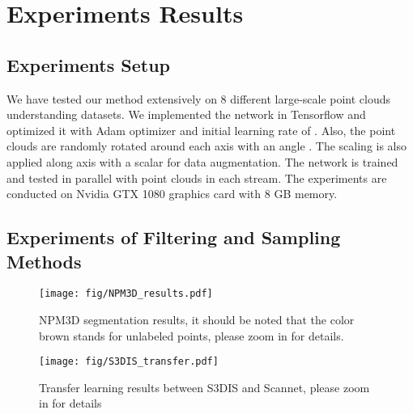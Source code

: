 \documentclass[journal]{IEEEtran}
\begin{document}
\vspace{-1.06mm}
\section{Experiments Results}
\subsection{Experiments Setup}
We have tested our method extensively on 8 different large-scale point clouds understanding datasets. We implemented the network in Tensorflow and optimized it with Adam optimizer and initial learning rate of .
Also, the point clouds are randomly rotated around each axis  with an angle . The scaling is also applied along  axis with a scalar  for data augmentation. The network is trained and tested in parallel with  point clouds in each stream. The experiments are conducted on Nvidia GTX 1080 graphics card with 8 GB memory. 
\subsection{Experiments of Filtering and Sampling Methods}



\begin{figure}[htbp!]
\centering
\texttt{[image: fig/NPM3D\_results.pdf]}
\caption{NPM3D segmentation results, it should be noted that the color brown stands for unlabeled points, please zoom in for details.}
\label{fig_NPM3D}
\end{figure}
\begin{figure}[htbp!]
\centering
\texttt{[image: fig/S3DIS\_transfer.pdf]}
\caption{Transfer learning results between S3DIS and Scannet, please zoom in for details}
\label{fig_transfer}
\end{figure}
\end{document}
